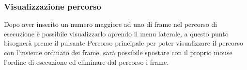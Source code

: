 \subsubsection{Visualizzazione percorso}
Dopo aver inserito un numero maggiore ad uno di frame nel percorso di esecuzione è possibile visualizzarlo aprendo il menu laterale, a questo punto bisognerà preme il pulsante Percorso principale per poter visualizzare il percorso con l'insieme ordinato dei frame, sarà possibile spostare con il proprio mouse l'ordine di esecuzione ed eliminare dal percorso i frame.
